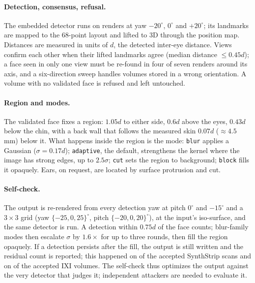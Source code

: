 \documentclass[11pt]{article}
\newcommand{\code}[1]{\texttt{#1}}
\begin{document}
\paragraph{Detection, consensus, refusal.} The embedded detector runs on
renders at yaw $-20^\circ$, $0^\circ$ and $+20^\circ$; its landmarks are
mapped to the 68-point layout and lifted to 3D through the position map.
Distances are measured in units of $d$, the detected inter-eye distance.
Views confirm each other when their lifted landmarks agree (median distance
$\le 0.45d$); a face seen in only one view must be re-found in four of seven
renders around its axis, and a six-direction sweep handles volumes stored in
a wrong orientation. A volume with no validated face is refused and left
untouched.

\paragraph{Region and modes.} The validated face fixes a region: $1.05d$ to
either side, $0.6d$ above the eyes, $0.43d$ below the chin, with a back wall
that follows the measured skin $0.07d$ ($\approx4.5$\,mm) below it. What
happens inside the region is the mode: \code{blur} applies a Gaussian
($\sigma=0.17d$); \code{adaptive}, the default, strengthens the kernel where
the image has strong edges, up to $2.5\sigma$; \code{cut} sets the region to
background; \code{block} fills it opaquely. Ears, on request, are located by
surface protrusion and cut.

\paragraph{Self-check.} The output is re-rendered from every detection yaw
at pitch $0^\circ$ and $-15^\circ$ and a $3\times3$ grid (yaw
$\{-25,0,25\}^\circ$, pitch $\{-20,0,20\}^\circ$), at the input's iso-surface,
and the same detector is run. A detection within $0.75d$ of the face counts;
blur-family modes then escalate $\sigma$ by $1.6\times$ for up to three
rounds, then fill the region opaquely. If a detection persists after the
fill, the output is still written and the residual count is reported; this
happened on \ssResidualAccepted{} of the accepted SynthStrip scans and on
\ixiResidualAccepted{} of the accepted IXI volumes. The self-check thus
optimizes the output against the very
detector that judges it; independent attackers are needed to evaluate it.
\end{document}
